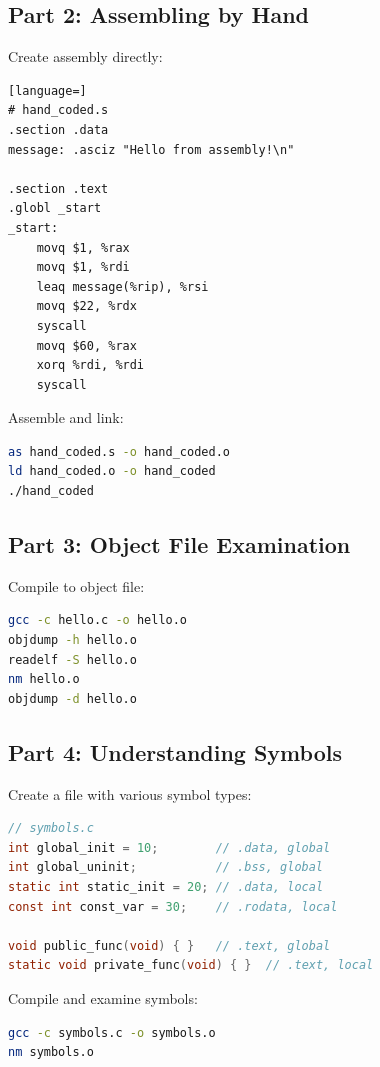\subsection{Part 2: Assembling by Hand}

Create assembly directly:

\begin{lstlisting}[language=]
# hand_coded.s
.section .data
message: .asciz "Hello from assembly!\n"

.section .text
.globl _start
_start:
    movq $1, %rax
    movq $1, %rdi
    leaq message(%rip), %rsi
    movq $22, %rdx
    syscall
    movq $60, %rax
    xorq %rdi, %rdi
    syscall
\end{lstlisting}

Assemble and link:

\begin{lstlisting}[language=bash]
as hand_coded.s -o hand_coded.o
ld hand_coded.o -o hand_coded
./hand_coded
\end{lstlisting}

\subsection{Part 3: Object File Examination}

Compile to object file:

\begin{lstlisting}[language=bash]
gcc -c hello.c -o hello.o
objdump -h hello.o
readelf -S hello.o
nm hello.o
objdump -d hello.o
\end{lstlisting}

\subsection{Part 4: Understanding Symbols}

Create a file with various symbol types:

\begin{lstlisting}[language=C]
// symbols.c
int global_init = 10;        // .data, global
int global_uninit;           // .bss, global
static int static_init = 20; // .data, local
const int const_var = 30;    // .rodata, local

void public_func(void) { }   // .text, global
static void private_func(void) { }  // .text, local
\end{lstlisting}

Compile and examine symbols:

\begin{lstlisting}[language=bash]
gcc -c symbols.c -o symbols.o
nm symbols.o
\end{lstlisting}

